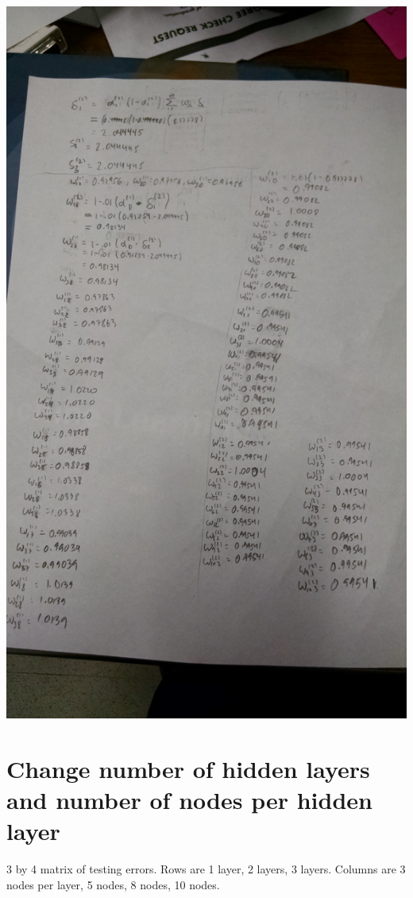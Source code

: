 \documentclass[10pt]{article}
\begin{document}
\begin{flushleft}
\includegraphics[width=\linewidth,height=\textheight]{./hand2.jpg}

\normalsize

\newpage

\section{Change number of hidden layers and number of nodes per hidden layer}

3 by 4 matrix of testing errors. Rows are 1 layer, 2 layers, 3 layers. Columns are 3 nodes per layer, 5 nodes, 8 nodes, 10 nodes.


\end{flushleft}
\end{document}
